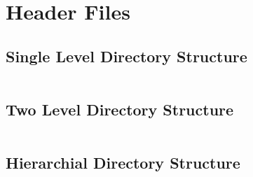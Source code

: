 \documentclass[10pt,a4paper,titlepage]{report}
\begin{document}
{\section*{Header Files}

\subsection*{Single Level Directory Structure}

\inputminted{c++}{../Programs/file_organization/single-level.h}


\subsection*{Two Level Directory Structure}

\inputminted{c++}{../Programs/file_organization/two-level.h}


\subsection*{Hierarchial Directory Structure}

\inputminted{c++}{../Programs/file_organization/hierarchial.h}

}
\end{document}
